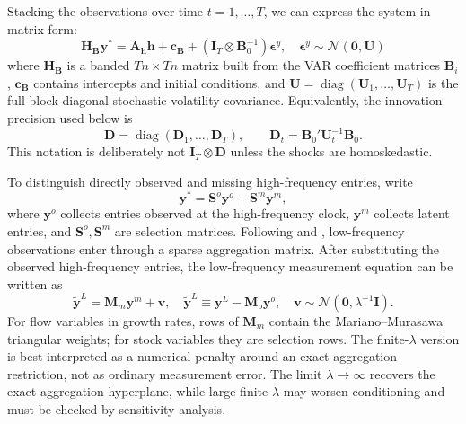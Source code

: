 \documentclass[12pt]{article}
\begin{document}
Stacking the observations over time $t=1,\dots,T$, we can express the system in matrix form:
\begin{equation}
    \mathbf{H}_{\mathbf{B}} \mathbf{y}^* = \mathbf{A}_{\mathbf{h}} \mathbf{h} + \mathbf{c}_{\mathbf{B}} + (\mathbf{I}_T \otimes \mathbf{B}_0^{-1}) \bm{\epsilon}^y, \quad \bm{\epsilon}^y \sim \mathcal{N}(\mathbf{0}, \mathbf{U})
\end{equation}
where $\mathbf{H}_{\mathbf{B}}$ is a banded $Tn \times Tn$ matrix built from the VAR coefficient matrices $\mathbf{B}_i$, $\mathbf{c}_{\mathbf{B}}$ contains intercepts and initial conditions, and $\mathbf{U}=\operatorname{diag}(\mathbf{U}_1,\ldots,\mathbf{U}_T)$ is the full block-diagonal stochastic-volatility covariance. Equivalently, the innovation precision used below is
\begin{equation}
    \mathbf{D} = \operatorname{diag}(\mathbf{D}_1,\ldots,\mathbf{D}_T), 
    \qquad \mathbf{D}_t = \mathbf{B}_0' \mathbf{U}_t^{-1} \mathbf{B}_0 .
\end{equation}
This notation is deliberately not $\mathbf{I}_T\otimes \mathbf{D}$ unless the shocks are homoskedastic.

To distinguish directly observed and missing high-frequency entries, write
\begin{equation}
    \mathbf{y}^*=\mathbf{S}^o\mathbf{y}^o+\mathbf{S}^m\mathbf{y}^m ,
\end{equation}
where $\mathbf{y}^o$ collects entries observed at the high-frequency clock, $\mathbf{y}^m$ collects latent entries, and $\mathbf{S}^o,\mathbf{S}^m$ are selection matrices. Following \citet{mariano2003new} and \citet{zhu2026structural}, low-frequency observations enter through a sparse aggregation matrix. After substituting the observed high-frequency entries, the low-frequency measurement equation can be written as
\begin{equation}
    \tilde{\mathbf{y}}^L = \mathbf{M}_m \mathbf{y}^m + \mathbf{v}, 
    \quad \tilde{\mathbf{y}}^L \equiv \mathbf{y}^L-\mathbf{M}_o\mathbf{y}^o,
    \quad \mathbf{v} \sim \mathcal{N}(\mathbf{0}, \lambda^{-1} \mathbf{I}) .
\end{equation}
For flow variables in growth rates, rows of $\mathbf{M}_m$ contain the Mariano--Murasawa triangular weights; for stock variables they are selection rows. The finite-$\lambda$ version is best interpreted as a numerical penalty around an exact aggregation restriction, not as ordinary measurement error. The limit $\lambda\rightarrow\infty$ recovers the exact aggregation hyperplane, while large finite $\lambda$ may worsen conditioning and must be checked by sensitivity analysis.
\end{document}
